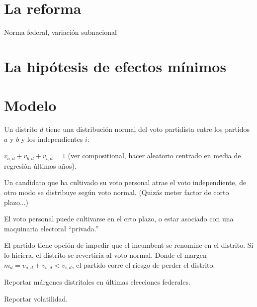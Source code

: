 \section{La reforma}

Norma federal, variación subnacional


\section{La hipótesis de efectos mínimos}


\section{Modelo}

Un distrito $d$ tiene una distribución normal del voto partidista entre los partidos $a$ y $b$ y los independientes $i$:

$v_{a,d} + v_{b,d} + v_{i,d} = 1$ (ver compositional, hacer aleatorio centrado en media de regresión últimos años).

Un candidato que ha cultivado su voto personal atrae el voto independiente, de otro modo se distribuye según voto normal. (Quizás meter factor de corto plazo...)

El voto personal puede cultivarse en el crto plazo, o estar asociado con una maquinaria electoral ``privada.''

El partido tiene opción de impedir que el incumbent se renomine en el distrito. Si lo hiciera, el distrito se revertiría al voto normal. Donde el margen $m_d = v_{a,d} + v_{b,d} < v_{i,d}$, el partido corre el riesgo de perder el distrito. 

Reportar márgenes distritales en últimas elecciones federales.

Reportar volatilidad. 
